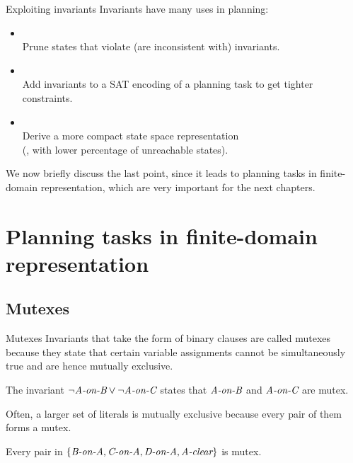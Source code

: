 \documentclass{gkibeamer}
\begin{document}
\begin{frame}{Exploiting invariants}
  Invariants have many uses in planning:
  \begin{itemize}
  \item {} \\
    \alert{Prune states} that violate (are inconsistent with)
    invariants.
  \item {} \\
    \alert{Add invariants} to a SAT encoding of a planning task to get
    tighter constraints.
  \item {} \\
    Derive a \alert{more compact} state space representation \\
    (\ie, with lower percentage of unreachable states).
  \end{itemize}

  \bigskip

  We now briefly discuss the last point, since it leads to
  \alert{planning tasks in finite-domain representation}, which are
  very important for the next chapters.
\end{frame}

\section[FDR planning tasks]{Planning tasks in finite-domain representation}

\subsection{Mutexes}

\begin{frame}{Mutexes}
  Invariants that take the form of \alert{binary clauses} are called
  \alert{mutexes} because they state that certain variable assignments
  cannot be simultaneously true and are hence \alert{mutually
    exclusive}.
  
  \begin{example}[Blocksworld]
    The invariant $\neg \textit{A-on-B} \lor \neg \textit{A-on-C}$ states that $\textit{A-on-B}$ and
    $\textit{A-on-C}$ are mutex.
  \end{example}

  Often, a larger \alert{set of literals} is mutually exclusive
  because every pair of them forms a mutex.

  \begin{example}[Blocksworld]
    Every pair in $\{\textit{B-on-A}, \textit{C-on-A}, \textit{D-on-A}, \textit{A-clear}\}$ is mutex.
  \end{example}
\end{frame}
\end{document}
